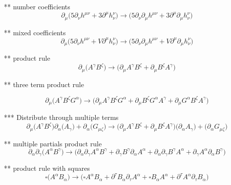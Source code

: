 \documentclass{article}
\def\){\Big)}
\def\({\Big(}
\begin{document}
** number coefficients
\begin{equation}
\partial_{\mu} \(5 \partial_{\nu}h^{\mu \nu} + 3 \partial^{\mu} h^{\nu }_{\nu}\)  \rightarrow  \(5 \partial_{\nu}\partial_{\mu}h^{\mu \nu} +3 \partial^{\mu}\partial_{\mu}h_{\nu}^{\nu} \)
\end{equation}

** mixed coefficients
\begin{equation}
\partial_{\mu} \(5 \partial_{\nu}h^{\mu \nu} + V \partial^{\mu} h^{\nu }_{\nu}\) \rightarrow \(5 \partial_{\nu}\partial_{\mu}h^{\mu \nu} +V \partial^{\mu}\partial_{\mu}h_{\nu}^{\nu} \)
\end{equation}

** product rule
\begin{equation}
\partial_{\mu} \( A^{\gamma}B^{\zeta}\) \rightarrow
 \( \partial_{\mu}A^{\gamma} B^{\zeta} + \partial_{\mu}B^{\zeta} A^{\gamma} \)
\end{equation}

** three term product rule

\begin{equation}
\partial_{\mu} \( A^{\gamma}B^{\zeta}G^{\alpha}\) \rightarrow
\( \partial_{\mu}A^{\gamma} B^{\zeta} G^{\alpha} + \partial_{\mu}B^{\zeta} G^{\alpha} A^{\gamma} + \partial_{\mu}G^{\alpha} B^{\zeta} A^{\gamma} \)
\end{equation}

*** Distribute through multiple terms
\begin{equation}
\partial_{\mu} \( A^{\gamma}B^{\zeta}\) \partial_{\alpha}\(A_{\gamma}\) + \partial_{\alpha}\(G_{\mu \zeta}\) \rightarrow
\( \partial_{\mu}A^{\gamma} B^{\zeta} + \partial_{\mu}B^{\zeta} A^{\gamma} \)\( \partial_{\alpha}A_{\gamma} \)+\( \partial_{\alpha}G_{\mu \zeta} \)
\end{equation}

** multiple partials product rule
\begin{equation}
\partial_{\alpha}\partial_{\gamma} \( A^{\alpha} B^{\gamma}\) \rightarrow
 \( \partial_{\alpha}\partial_{\gamma}A^{\alpha} B^{\gamma} + \partial_{\gamma}B^{\gamma} \partial_{\alpha}A^{\alpha} + \partial_{\alpha}\partial_{\gamma}B^{\gamma} A^{\alpha} + \partial_{\gamma}A^{\alpha} \partial_{\alpha}B^{\gamma} \)
\end{equation}

** product rule with squares\\

\begin{equation}
\square \(A^{\alpha}B_{\alpha}\) 
\rightarrow
\( \square A^{\alpha} B_{\alpha} + \partial^{\tau} B_{\alpha} \partial_{\tau} A^{\alpha} + \square B_{\alpha} A^{\alpha} + \partial^{\tau} A^{\alpha} \partial_{\tau} B_{\alpha} \)
\end{equation}
\end{document}
